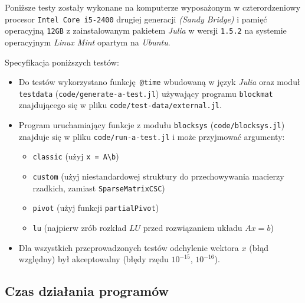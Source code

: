 \documentclass[10pt]{article}
\begin{document}
Poniższe testy zostały wykonane na komputerze wyposażonym w czterordzeniowy procesor \texttt{Intel Core i5-2400} drugiej generacji \textit{(Sandy Bridge)} i pamięć operacyjną \texttt{12GB} z zainstalowanym pakietem \textit{Julia} w wersji \texttt{1.5.2} na systemie operacyjnym \textit{Linux Mint} opartym na \textit{Ubuntu}.

\noindent Specyfikacja poniższych testów:
\begin{itemize}
    \item Do testów wykorzystano funkcję \texttt{@time} wbudowaną w język \textit{Julia} oraz moduł \texttt{testdata} (\texttt{code/generate-a-test.jl}) używający programu \texttt{blockmat} znajdującego się w pliku \texttt{code/test-data/external.jl}.
    \item Program uruchamiający funkcje z modułu \texttt{blocksys} (\texttt{code/blocksys.jl}) znajduje się w pliku \texttt{code/run-a-test.jl} i może przyjmować argumenty:
    \begin{itemize}
        \item \texttt{classic} (użyj \texttt{x = A\textbackslash b})
        \item \texttt{custom} (użyj niestandardowej struktury do przechowywania macierzy rzadkich, zamiast \texttt{SparseMatrixCSC})
        \item \texttt{pivot} (użyj funkcji \texttt{partialPivot})
        \item \texttt{lu} (najpierw zrób rozkład $LU$ przed rozwiązaniem układu $Ax = b$)
    \end{itemize}
    \item Dla wszystkich przeprowadzonych testów odchylenie wektora $x$ (błąd względny) był akceptowalny (błędy rzędu $10^{-15}$, $10^{-16}$).
\end{itemize}

\subsection{Czas działania programów}
\end{document}
